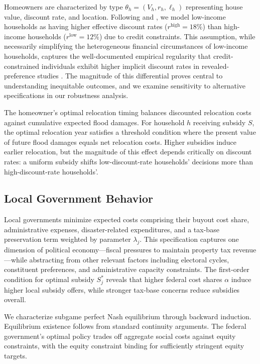 \documentclass[preprint,12pt,authoryear]{elsarticle}
\begin{document}
Homeowners are characterized by type $\theta_h = (V_h, r_h, \ell_h)$ representing house value, discount rate, and location. Following \citet{warner2001personal} and \citet{bier2019game}, we model low-income households as having higher effective discount rates ($r^{\text{high}} = 18\%$) than high-income households ($r^{\text{low}} = 12\%$) due to credit constraints. This assumption, while necessarily simplifying the heterogeneous financial circumstances of low-income households, captures the well-documented empirical regularity that credit-constrained individuals exhibit higher implicit discount rates in revealed-preference studies \citep{hausman1979individual, frederick2002time}. The magnitude of this differential proves central to understanding inequitable outcomes, and we examine sensitivity to alternative specifications in our robustness analysis.

The homeowner's optimal relocation timing balances discounted relocation costs against cumulative expected flood damages. For household $h$ receiving subsidy $S$, the optimal relocation year satisfies a threshold condition where the present value of future flood damages equals net relocation costs. Higher subsidies induce earlier relocation, but the magnitude of this effect depends critically on discount rates: a uniform subsidy shifts low-discount-rate households' decisions more than high-discount-rate households'.

\subsection{Local Government Behavior}

Local governments minimize expected costs comprising their buyout cost share, administrative expenses, disaster-related expenditures, and a tax-base preservation term weighted by parameter $\lambda_j$. This specification captures one dimension of political economy---fiscal pressures to maintain property tax revenue---while abstracting from other relevant factors including electoral cycles, constituent preferences, and administrative capacity constraints. The first-order condition for optimal subsidy $S_j^*$ reveals that higher federal cost shares $\alpha$ induce higher local subsidy offers, while stronger tax-base concerns reduce subsidies overall.

We characterize subgame perfect Nash equilibrium through backward induction. Equilibrium existence follows from standard continuity arguments. The federal government's optimal policy trades off aggregate social costs against equity constraints, with the equity constraint binding for sufficiently stringent equity targets.
\end{document}
